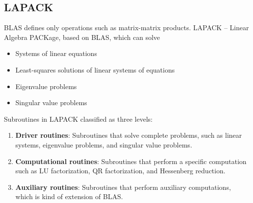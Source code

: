 \subsection{LAPACK}

BLAS defines only operations such as matrix-matrix
products. LAPACK – Linear Algebra PACKage, based on BLAS, which can solve
\begin{itemize}
    \item Systems of linear equations
    \item Least-squares solutions of linear systems of equations
    \item Eigenvalue problems
    \item Singular value problems
\end{itemize}

Subroutines in LAPACK classified as three levels:
\begin{enumerate}
    \item \textbf{Driver routines}: Subroutines that solve complete problems, such as linear systems, eigenvalue problems, and singular value problems.
    \item \textbf{Computational routines}: Subroutines that perform a specific computation such as LU factorization, QR factorization, and Hessenberg reduction.
    \item \textbf{Auxiliary routines}: Subroutines that perform auxiliary computations, which is kind of extension of BLAS.
\end{enumerate}

